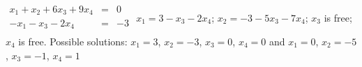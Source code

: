 {$\begin{array}{rcl}
x_1+x_2+6x_3+9x_4&=&0\\
-x_1-x_3-2x_4&=&-3\\
\end{array}$}
{$x_1=3-x_3-2x_4$; $x_2=-3-5x_3-7x_4$; $x_3$ is free; $x_4$ is free. Possible solutions: $x_1 =3$, $x_2 = -3$, $x_3=0$, $x_4=0$ and $x_1 = 0$, $x_2 = -5$, $x_3 =-1$, $x_4=1$ }